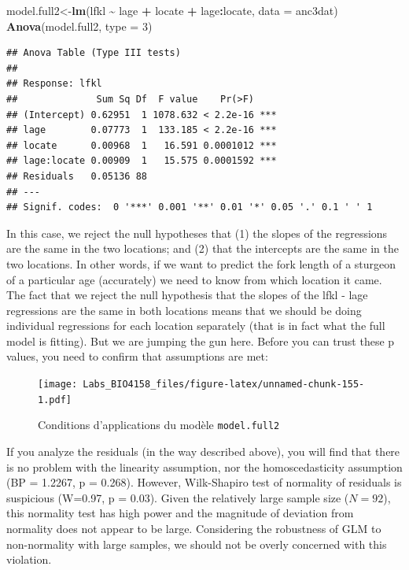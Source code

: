 \documentclass[
  12pt,
]{book}
\newenvironment{Shaded}{\begin{snugshade}}{\end{snugshade}}
\newcommand{\DataTypeTok}[1]{\textcolor[rgb]{0.13,0.29,0.53}{#1}}
\newcommand{\DecValTok}[1]{\textcolor[rgb]{0.00,0.00,0.81}{#1}}
\newcommand{\KeywordTok}[1]{\textcolor[rgb]{0.13,0.29,0.53}{\textbf{#1}}}
\newcommand{\NormalTok}[1]{#1}
\newcommand{\OperatorTok}[1]{\textcolor[rgb]{0.81,0.36,0.00}{\textbf{#1}}}
\newcommand{\StringTok}[1]{\textcolor[rgb]{0.31,0.60,0.02}{#1}}
\begin{document}
\begin{Shaded}
\begin{Highlighting}[]
\NormalTok{model.full2\textless{}{-}}\KeywordTok{lm}\NormalTok{(lfkl }\OperatorTok{\textasciitilde{}}\StringTok{ }\NormalTok{lage }\OperatorTok{+}\StringTok{ }\NormalTok{locate }\OperatorTok{+}\StringTok{ }\NormalTok{lage}\OperatorTok{:}\NormalTok{locate, }\DataTypeTok{data =}\NormalTok{ anc3dat)}
\KeywordTok{Anova}\NormalTok{(model.full2, }\DataTypeTok{type =} \DecValTok{3}\NormalTok{)}
\end{Highlighting}
\end{Shaded}

\begin{verbatim}
## Anova Table (Type III tests)
## 
## Response: lfkl
##              Sum Sq Df  F value    Pr(>F)    
## (Intercept) 0.62951  1 1078.632 < 2.2e-16 ***
## lage        0.07773  1  133.185 < 2.2e-16 ***
## locate      0.00968  1   16.591 0.0001012 ***
## lage:locate 0.00909  1   15.575 0.0001592 ***
## Residuals   0.05136 88                       
## ---
## Signif. codes:  0 '***' 0.001 '**' 0.01 '*' 0.05 '.' 0.1 ' ' 1
\end{verbatim}

In this case, we reject the null hypotheses that (1) the slopes of the regressions are the same in the two locations; and (2) that the intercepts are the same in the two locations. In other words, if we want to predict the fork length of a sturgeon of a particular age (accurately) we need to know from which location it came. The fact that we reject the null hypothesis that the slopes of the lfkl - lage regressions are the same in both locations means that we should be doing individual regressions for each location separately (that is in fact what the full model is fitting). But we are jumping the gun here. Before you can trust these p values, you need to confirm that assumptions are met:

\begin{figure}
\centering
\texttt{[image: Labs\_BIO4158\_files/figure-latex/unnamed-chunk-155-1.pdf]}
\caption{\label{fig:unnamed-chunk-155}Conditions d'applications du modèle \texttt{model.full2}}
\end{figure}

If you analyze the residuals (in the way described above), you will find that there is no problem with the linearity assumption, nor the homoscedasticity assumption (BP = 1.2267, p = 0.268). However, Wilk-Shapiro test of normality of residuals is suspicious (W=0.97, p = 0.03). Given the relatively large sample size (\(N = 92\)), this normality test has high power and the magnitude of deviation from normality does not appear to be large. Considering the robustness of GLM to non-normality with large samples, we should not be overly concerned with this violation.
\end{document}
